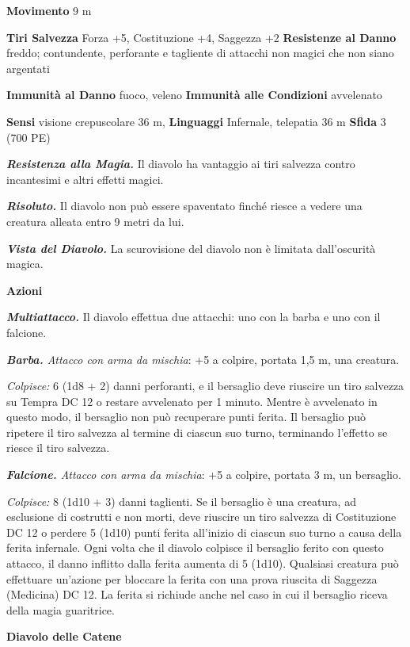 \begin{multicols}{2}
\textbf{Movimento} 9 m

\textbf{Tiri Salvezza} Forza +5, Costituzione +4, Saggezza +2
\textbf{Resistenze al Danno} freddo; contundente, perforante e tagliente
di attacchi non magici che non siano argentati

\textbf{Immunità al Danno} fuoco, veleno \textbf{Immunità alle
Condizioni} avvelenato

\textbf{Sensi} visione crepuscolare 36 m, 
\textbf{Linguaggi} Infernale, telepatia 36 m \textbf{Sfida} 3 (700 PE)

\emph{\textbf{Resistenza alla Magia.}} Il diavolo ha vantaggio ai tiri
salvezza contro incantesimi e altri effetti magici.

\emph{\textbf{Risoluto.}} Il diavolo non può essere spaventato finché
riesce a vedere una creatura alleata entro 9 metri da lui.

\emph{\textbf{Vista del Diavolo.}} La scurovisione del diavolo non è
limitata dall'oscurità magica.

\textbf{Azioni}

\emph{\textbf{Multiattacco.}} Il diavolo effettua due attacchi: uno con
la barba e uno con il falcione.

\emph{\textbf{Barba.} Attacco con arma da mischia}: +5 a colpire,
portata 1,5 m, una creatura.

\emph{Colpisce:} 6 (1d8 + 2) danni perforanti, e il bersaglio deve
riuscire un tiro salvezza su Tempra DC 12 o restare avvelenato per
1 minuto. Mentre è avvelenato in questo modo, il bersaglio non può
recuperare punti ferita. Il bersaglio può ripetere il tiro salvezza al
termine di ciascun suo turno, terminando l'effetto se riesce il tiro
salvezza.

\emph{\textbf{Falcione.} Attacco con arma da mischia}: +5 a colpire,
portata 3 m, un bersaglio.

\emph{Colpisce:} 8 (1d10 + 3) danni taglienti. Se il bersaglio è una
creatura, ad esclusione di costrutti e non morti, deve riuscire un tiro
salvezza di Costituzione DC 12 o perdere 5 (1d10) punti ferita
all'inizio di ciascun suo turno a causa della ferita infernale. Ogni
volta che il diavolo colpisce il bersaglio ferito con questo attacco, il
danno inflitto dalla ferita aumenta di 5 (1d10). Qualsiasi creatura può
effettuare un'azione per bloccare la ferita con una prova riuscita di
Saggezza (Medicina) DC 12. La ferita si richiude anche nel caso in cui
il bersaglio riceva della magia guaritrice.



\textbf{Diavolo delle Catene}


\end{multicols}
